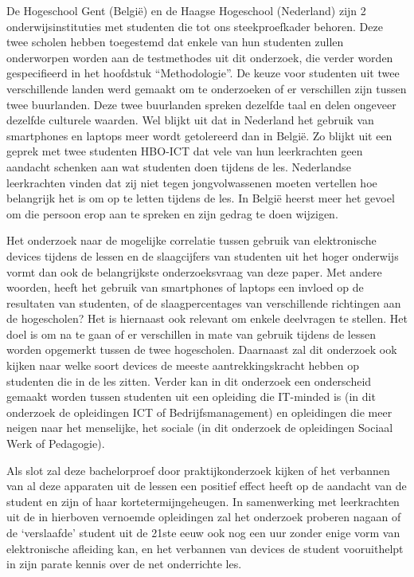 De Hogeschool Gent (België) en de Haagse Hogeschool (Nederland) zijn 2 onderwijsinstituties met studenten die tot ons steekproefkader behoren. Deze twee scholen hebben toegestemd dat enkele van hun studenten zullen onderworpen worden aan de testmethodes uit dit onderzoek, die verder worden gespecifieerd in het hoofdstuk “Methodologie”. De keuze voor studenten uit twee verschillende landen werd gemaakt om te onderzoeken of er verschillen zijn tussen twee buurlanden. Deze twee buurlanden spreken dezelfde taal en delen ongeveer dezelfde culturele waarden. Wel blijkt uit \textcite{VanGaalen2017} dat in Nederland het gebruik van smartphones en laptops meer wordt getolereerd dan in België. Zo blijkt uit een geprek met twee studenten HBO-ICT dat vele van hun leerkrachten geen aandacht schenken aan wat studenten doen tijdens de les. Nederlandse leerkrachten vinden dat zij niet tegen jongvolwassenen moeten vertellen hoe belangrijk het is om op te letten tijdens de les. In België heerst meer het gevoel om die persoon erop aan te spreken en zijn gedrag te doen wijzigen.

Het onderzoek naar de mogelijke correlatie tussen gebruik van elektronische devices tijdens de lessen en de slaagcijfers van studenten uit het hoger onderwijs vormt dan ook de belangrijkste onderzoeksvraag van deze paper. Met andere woorden, heeft het gebruik van smartphones of laptops een invloed op de resultaten van studenten, of de slaagpercentages van verschillende richtingen aan de hogescholen? Het is hiernaast ook relevant om enkele deelvragen te stellen. Het doel is om na te gaan of er verschillen in mate van gebruik tijdens de lessen worden opgemerkt tussen de twee hogescholen. Daarnaast zal dit onderzoek ook kijken naar welke soort devices de meeste aantrekkingskracht hebben op studenten die in de les zitten. Verder kan in dit onderzoek een onderscheid gemaakt worden tussen studenten uit een opleiding die IT-minded is (in dit onderzoek de opleidingen ICT of Bedrijfsmanagement) en opleidingen die meer neigen naar het menselijke, het sociale (in dit onderzoek de opleidingen Sociaal Werk of Pedagogie).

Als slot zal deze bachelorproef door praktijkonderzoek kijken of het verbannen van al deze apparaten uit de lessen een positief effect heeft op de aandacht van de student en zijn of haar kortetermijngeheugen. In samenwerking met leerkrachten uit de in hierboven vernoemde opleidingen zal het onderzoek proberen nagaan of de ‘verslaafde’ student uit de 21ste eeuw ook nog een uur zonder enige vorm van elektronische afleiding kan, en het verbannen van devices de student vooruithelpt in zijn parate kennis over de net onderrichte les.

